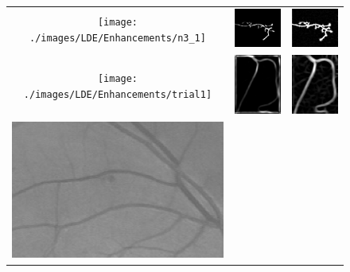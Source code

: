 \begin{figure}[t]
\centering
\renewcommand{\tabcolsep}{0.04cm}
	\begin{tabular}{@{}ccc @{}}
		\texttt{[image: ./images/LDE/Enhancements/n3\_1]} &
		\includegraphics[width=0.28\linewidth]{./images/LDE/Enhancements/n3_1_frangi} &
		\includegraphics[width=0.28\linewidth]{./images/LDE/Enhancements/n3_1_ours} 
		\\
		\texttt{[image: ./images/LDE/Enhancements/trial1]} &
		\includegraphics[width=0.28\linewidth]{./images/LDE/Enhancements/trial1_enh_frangi} &
		\includegraphics[width=0.28\linewidth]{./images/LDE/Enhancements/trial1_enh_ours} 
		\\
		\includegraphics[width=0.28\linewidth]{./images/LDE/Enhancements/vessel_crop_1} &

\end{tabular}
\end{figure}
